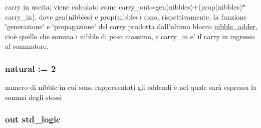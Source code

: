 carry in uscita; viene calcolato come carry\+\_\+out=gen(nibbles)+(prop(nibbles)$\ast$carry\+\_\+in), dove gen(nibbles) e prop(nibbles) sono, rispettivamente, la funzione \char`\"{}generazione\char`\"{} e \char`\"{}propagazione\char`\"{} del carry prodotta dall'ultimo blocco \hyperlink{classnibble__adder}{nibble\+\_\+adder}, cioè quello che somma i nibble di peso massimo, e carry\+\_\+in e' il carry in ingresso al sommatore. 

\hypertarget{group___carry_loockahead_ga98a3a5b152caf0f2de1e31ac60088369}{
\subsubsection[{nibble\+\_\+adder}]{ {\bfseries \textcolor{vhdlchar}{ }} \hspace{0.3cm}{\ttfamily [Component]}}}\label{group___carry_loockahead_ga98a3a5b152caf0f2de1e31ac60088369}
\hypertarget{group___carry_loockahead_ga0b63b586531492d0fa882246cca071c1}{
\subsubsection[{nibbles}]{ {\bfseries \textcolor{vhdlchar}{ }} {\bfseries \textcolor{vhdlchar}{natural}\textcolor{vhdlchar}{ }\textcolor{vhdlchar}{ }\textcolor{vhdlchar}{\+:}\textcolor{vhdlchar}{=}\textcolor{vhdlchar}{ }\textcolor{vhdlchar}{ } \textcolor{vhdldigit}{2} \textcolor{vhdlchar}{ }} \hspace{0.3cm}{\ttfamily [Generic]}}}\label{group___carry_loockahead_ga0b63b586531492d0fa882246cca071c1}


numero di nibble in cui sono rappresentati gli addendi e nel quale sarà espressa la somma degli stessi 

\hypertarget{group___carry_loockahead_ga9650307dde287e0bcfa1e26370c006c2}{
\subsubsection[{overflow}]{ {\bfseries \textcolor{vhdlchar}{out}\textcolor{vhdlchar}{ }} {\bfseries \textcolor{vhdlchar}{std\+\_\+logic}\textcolor{vhdlchar}{ }} \hspace{0.3cm}{\ttfamily [Port]}}}\label{group___carry_loockahead_ga9650307dde287e0bcfa1e26370c006c2}


